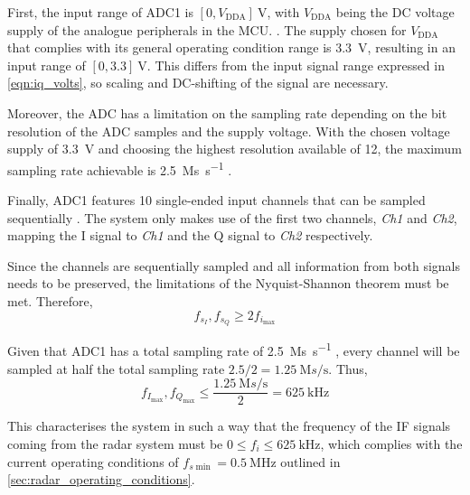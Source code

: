 First, the input range of ADC1 is $[0, V_\mathrm{DDA}]\ \si{\volt}$, with $V_\mathrm{DDA}$ being the DC voltage supply of the analogue peripherals in the MCU.
\cite[p.~103]{STMicroelectronics2022}. The supply chosen for $V_\mathrm{DDA}$ that complies with its general operating condition range \cite[p.~62]{STMicroelectronics2022} is \SI{3.3}{\volt}, resulting in an input range of $[0, 3.3]\ \si{\volt}$. This differs from the input signal range expressed in \cref{eqn:iq_volts}, so scaling and DC-shifting of the signal are necessary.

Moreover, the ADC has a limitation on the sampling rate depending on the bit resolution of the ADC samples and the supply voltage. With the chosen voltage supply of \SI{3.3}{\volt} and choosing the highest resolution available of \SI{12}{\bit}, the maximum sampling rate achievable is \SI{2.5}{\mega s\per\second} \cite[p.~103]{STMicroelectronics2022}.

Finally, ADC1 features 10 single-ended input channels that can be sampled sequentially \cite[p.~355]{STMicroelectronics2022a}. The system only makes use of the first two channels, \textit{Ch1} and \textit{Ch2}, mapping the I signal to \textit{Ch1} and the Q signal to \textit{Ch2} respectively.

Since the channels are sequentially sampled and all information from both signals needs to be preserved, the limitations of the Nyquist-Shannon theorem \cite{Shannon1949} must be met. Therefore,
\begin{equation} \label{eqn:nyquist_sampling}
	f_{s_{I}}, f_{s_{Q}} \ge 2 f_{i_{\max}}
\end{equation}

Given that ADC1 has a total sampling rate of \SI{2.5}{\mega s\per\second} \cite[p.~103]{STMicroelectronics2022}, every channel will be sampled at half the total sampling rate $2.5/2 = \SI{1.25}{\mega s\per\second}$. Thus,
\begin{equation} \label{eqn:nyquist_sampling}
	f_{I_{\max}}, f_{Q_{\max}} \le \frac{\SI{1.25}{\mega s\per\second}}{2} = \SI{625}{\kilo\hertz}
\end{equation}

This characterises the system in such a way that the frequency of the IF signals coming from the radar system must be $ 0 \le f_i \le \SI{625}{\kilo\hertz}$, which complies with the current operating conditions of $f_{s\min} = \SI{0.5}{\mega\hertz}$ outlined in \cref{sec:radar_operating_conditions}.


